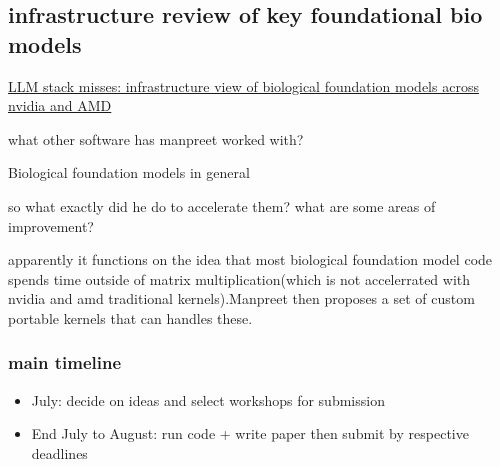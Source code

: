 \documentclass{article}
\begin{document}
\subsection{infrastructure review of key foundational bio models}
\href{https://devmanpreet5-portfolio.vercel.app/research/llm-stack-misses/index.html}{LLM stack misses: infrastructure view of biological foundation models across nvidia and AMD}
\begin{question}
what other software has manpreet worked with?
\end{question}

Biological foundation models in general

\begin{question}
so what exactly did he do to accelerate them? what are some areas of improvement?
\end{question}
apparently it functions on the idea that most biological foundation model code spends time outside of matrix multiplication(which is not accelerrated with nvidia and amd traditional kernels).Manpreet then proposes a set of custom portable kernels that can handles these.


\subsubsection*{main timeline}
\begin{itemize}
    \item July: decide on ideas and select workshops for submission 
    \item End July to August: run code + write paper then submit by respective deadlines
\end{itemize}

\printbibliography
\end{document}
